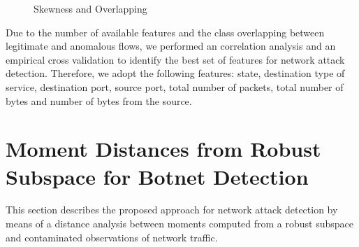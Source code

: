 \documentclass[review]{elsarticle}
\begin{document}
\begin{figure}[!htb]
	\centering
	\caption[Skewness and Overlapping]{Skewness and Overlapping}
	\label{fig:4.10}
\end{figure}

Due to the number of available features and the class overlapping between legitimate and anomalous flows, we performed an correlation analysis and an empirical cross validation to identify the best set of features for network attack detection. Therefore, we adopt the following features: state, destination type of service, destination port, source port, total number of packets, total number of bytes and number of bytes from the source.

\section{Moment Distances from Robust Subspace for Botnet Detection}
\label{sec:mdrs}


This section describes the proposed approach for network attack detection by means of a distance analysis between moments computed from a robust subspace and contaminated observations of network traffic. 
\end{document}
